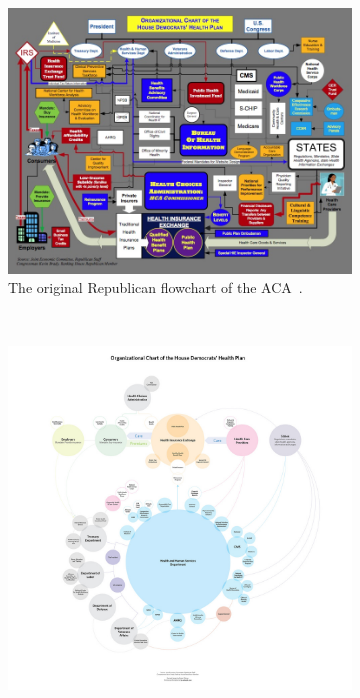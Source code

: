 \documentclass{vgtc}                          %
\begin{document}
\begin{figure}[!th]
	\centering
	\begin{subfigure}{0.9\columnwidth}
		\includegraphics[width=\textwidth]{pictures/healthdirty.jpg}
		\caption{The original Republican flowchart of the ACA~\protect\cite{boehner}.}
	\end{subfigure}
	~
	\begin{subfigure}{0.9\columnwidth}
		\includegraphics[width=\textwidth]{pictures/healthclean.jpg}

\end{subfigure}
\end{figure}
\end{document}
